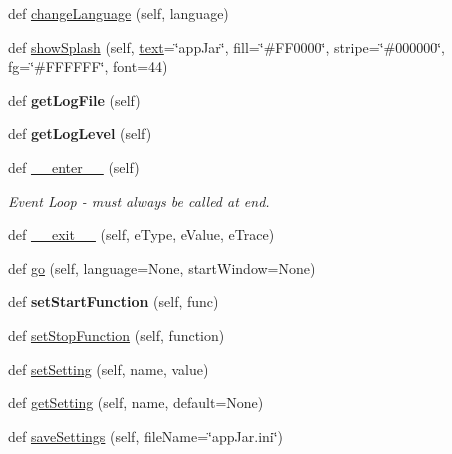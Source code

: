 \begin{DoxyCompactItemize}
\item 
def \hyperlink{classappjar_1_1gui_a86a7b45923f8da9000c07ff501899613}{change\+Language} (self, language)
\item 
def \hyperlink{classappjar_1_1gui_a3bd652a233894c5e787a2c1fa2060dad}{show\+Splash} (self, \hyperlink{classappjar_1_1gui_a221b516425bf76dd8560ec9f4818182f}{text}=\char`\"{}app\+Jar\char`\"{}, fill=\char`\"{}\#F\+F0000\char`\"{}, stripe=\char`\"{}\#000000\char`\"{}, fg=\char`\"{}\#F\+F\+F\+F\+FF\char`\"{}, font=44)
\item 
\mbox{\label{classappjar_1_1gui_a6767e6cf6929f83ac6688ea42a988ebf}} 
def {\bfseries get\+Log\+File} (self)
\item 
\mbox{\label{classappjar_1_1gui_a4f3702dd10ff73afd0f266fb2c7e792b}} 
def {\bfseries get\+Log\+Level} (self)
\item 
def \hyperlink{classappjar_1_1gui_a080c7b5f758b543e7c65e02040aa5f58}{\+\_\+\+\_\+enter\+\_\+\+\_\+} (self)
\begin{DoxyCompactList}\small\item\em Event Loop -\/ must always be called at end. \end{DoxyCompactList}\item 
def \hyperlink{classappjar_1_1gui_ab8813abec96530e73c4466962ccfc582}{\+\_\+\+\_\+exit\+\_\+\+\_\+} (self, e\+Type, e\+Value, e\+Trace)
\item 
def \hyperlink{classappjar_1_1gui_aaaa8a9d7f13977878bbabd556169c48a}{go} (self, language=None, start\+Window=None)
\item 
\mbox{\label{classappjar_1_1gui_a712eb810aa8b9111e9e7463c4797db56}} 
def {\bfseries set\+Start\+Function} (self, func)
\item 
def \hyperlink{classappjar_1_1gui_a0c8b2b61b8520ab0dbd1ae6220715504}{set\+Stop\+Function} (self, function)
\item 
def \hyperlink{classappjar_1_1gui_a2aa09449c7dcd6d9a8024c33817f9523}{set\+Setting} (self, name, value)
\item 
def \hyperlink{classappjar_1_1gui_a85dbd7d7177d4fa238d1c6ef1452685d}{get\+Setting} (self, name, default=None)
\item 
def \hyperlink{classappjar_1_1gui_a8c51df5e4d92a65cb11aaccb79674833}{save\+Settings} (self, file\+Name=\char`\"{}app\+Jar.\+ini\char`\"{})
\item 

\end{DoxyCompactItemize}
